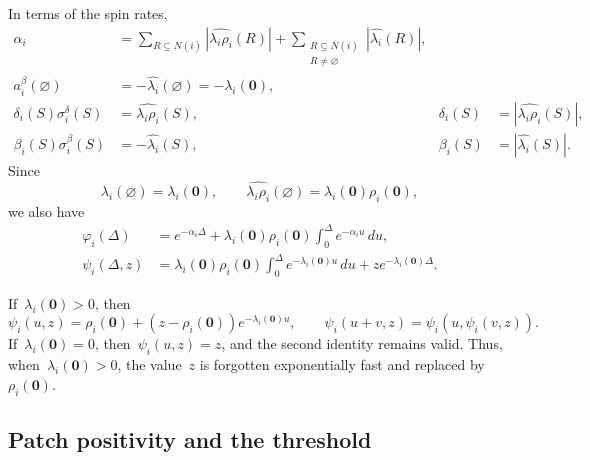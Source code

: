 \documentclass[EJP,preprint,NODS,nobera]{ejpecp}
\newcommand{\R}{\mathbb{R}}
\newcommand{\bb}[1]{\left(#1\right)}
\newcommand{\abs}[1]{\left|#1\right|}
\newcommand{\mb}[1]{\mathbf{#1}}
\newcommand{\rev}[1]{{\color{red}#1}}
\begin{document}
\begin{remark}
\label{rem:spin-rate-contributions}
In terms of the spin rates,
\begin{equation}
\label{eq:dual-to-spin-contribution-data}
\begin{aligned}
\alpha_i
&=
\sum_{R\subseteq N(i)}\abs{\widehat{\lambda_i\rho_i}(R)}
+
\sum_{\substack{R\subseteq N(i)\\R\neq\varnothing}}
\abs{\widehat{\lambda_i}(R)},
\\
a_i^\beta(\varnothing)
&=
-\widehat{\lambda_i}(\varnothing)
=
-\lambda_i(\mb 0),
\\
\delta_i(S)\sigma_i^\delta(S)
&=
\widehat{\lambda_i\rho_i}(S),
&\delta_i(S)
&=
\abs{\widehat{\lambda_i\rho_i}(S)},
\\
\beta_i(S)\sigma_i^\beta(S)
&=
-\widehat{\lambda_i}(S),
&\beta_i(S)
&=
\abs{\widehat{\lambda_i}(S)}.
\end{aligned}
\end{equation}
Since
\begin{equation*}
\widehat{\lambda_i}(\varnothing)=\lambda_i(\mb 0),
\qquad
\widehat{\lambda_i\rho_i}(\varnothing)
=
\lambda_i(\mb 0)\rho_i(\mb 0),
\end{equation*}
we also have
\begin{align*}
\varphi_i(\Delta)
&=
e^{-\alpha_i\Delta}
+
\lambda_i(\mb 0)\rho_i(\mb 0)
\int_0^\Delta e^{-\alpha_i u}\,du,
\\
\psi_i(\Delta,z)
&=
\lambda_i(\mb 0)\rho_i(\mb 0)
\int_0^\Delta e^{-\lambda_i(\mb 0)u}\,du
+
z e^{-\lambda_i(\mb 0)\Delta}.
\end{align*}

If~$\lambda_i(\mb 0)>0$, then
\begin{equation}
\label{eq:all-zero-neighbourhood-relaxation}
\psi_i(u,z)
=
\rho_i(\mb 0)
+
\bb{z-\rho_i(\mb 0)}e^{-\lambda_i(\mb 0)u},
\qquad
\psi_i(u+v,z)
=
\psi_i\bb{u,\psi_i(v,z)}.
\end{equation}
If~$\lambda_i(\mb 0)=0$, then~$\psi_i(u,z)=z$, and the second identity remains
valid.
Thus, when~$\lambda_i(\mb 0)>0$, the value~$z$ is forgotten exponentially
fast and replaced by~$\rho_i(\mb 0)$.
\end{remark}

\subsection{\texorpdfstring{\rev{Patch positivity and the threshold}}{Patch positivity and the threshold}}
\label{subsec:proof-patch-positivity-threshold}
\end{document}
